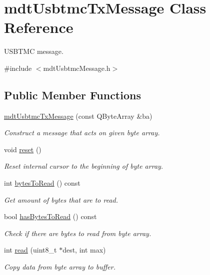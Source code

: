 \hypertarget{classmdt_usbtmc_tx_message}{\section{mdt\-Usbtmc\-Tx\-Message Class Reference}
\label{classmdt_usbtmc_tx_message}
}


U\-S\-B\-T\-M\-C message.  




{\ttfamily \#include $<$mdt\-Usbtmc\-Message.\-h$>$}

\subsection*{Public Member Functions}
\begin{DoxyCompactItemize}
\item 
\hyperlink{classmdt_usbtmc_tx_message_ae33e2c33772aebd66b0d5bdcdf178302}{mdt\-Usbtmc\-Tx\-Message} (const Q\-Byte\-Array \&ba)
\begin{DoxyCompactList}\small\item\em Construct a message that acts on given byte array. \end{DoxyCompactList}\item 
void \hyperlink{classmdt_usbtmc_tx_message_a446fbe82886e29e9d9909ffcb4379279}{reset} ()
\begin{DoxyCompactList}\small\item\em Reset internal cursor to the beginning of byte array. \end{DoxyCompactList}\item 
int \hyperlink{classmdt_usbtmc_tx_message_ac785443932d0e4a028c11cacce615608}{bytes\-To\-Read} () const 
\begin{DoxyCompactList}\small\item\em Get amount of bytes that are to read. \end{DoxyCompactList}\item 
bool \hyperlink{classmdt_usbtmc_tx_message_a190a9ba7ccf009e12d55ae227304e255}{has\-Bytes\-To\-Read} () const 
\begin{DoxyCompactList}\small\item\em Check if there are bytes to read from byte array. \end{DoxyCompactList}\item 
int \hyperlink{classmdt_usbtmc_tx_message_a673b9b28cb2f4e38323bfb0dfbe81d7a}{read} (uint8\-\_\-t $\ast$dest, int max)
\begin{DoxyCompactList}\small\item\em Copy data from byte array to buffer. \end{DoxyCompactList}\end{DoxyCompactItemize}


